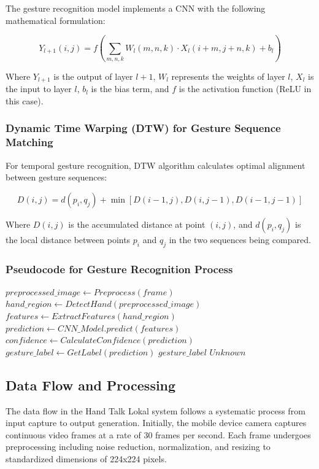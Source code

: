 \documentclass[12pt]{article}
\begin{document}
The gesture recognition model implements a CNN with the following mathematical formulation:

\[
Y_{l+1}(i,j) = f\left(\sum_{m,n,k} W_l(m,n,k) \cdot X_l(i+m, j+n, k) + b_l\right)
\]

Where $Y_{l+1}$ is the output of layer $l+1$, $W_l$ represents the weights of layer $l$, $X_l$ is the input to layer $l$, $b_l$ is the bias term, and $f$ is the activation function (ReLU in this case).

\subsubsection{Dynamic Time Warping (DTW) for Gesture Sequence Matching}

For temporal gesture recognition, DTW algorithm calculates optimal alignment between gesture sequences:

\[
D(i,j) = d(p_i, q_j) + \min\left[D(i-1,j), D(i,j-1), D(i-1,j-1)\right]
\]

Where $D(i,j)$ is the accumulated distance at point $(i,j)$, and $d(p_i, q_j)$ is the local distance between points $p_i$ and $q_j$ in the two sequences being compared.

\subsubsection{Pseudocode for Gesture Recognition Process}

\begin{algorithmic}[1]
    \State $preprocessed\_image \gets Preprocess(frame)$
    \State $hand\_region \gets DetectHand(preprocessed\_image)$
    \State $features \gets ExtractFeatures(hand\_region)$
    \State $prediction \gets CNN\_Model.predict(features)$
    \State $confidence \gets CalculateConfidence(prediction)$
        \State $gesture\_label \gets GetLabel(prediction)$
        \State \Return $gesture\_label$
    \Else
        \State \Return $Unknown$
    \EndIf
\EndProcedure
\end{algorithmic}

\subsection{Data Flow and Processing}

The data flow in the Hand Talk Lokal system follows a systematic process from input capture to output generation. Initially, the mobile device camera captures continuous video frames at a rate of 30 frames per second. Each frame undergoes preprocessing including noise reduction, normalization, and resizing to standardized dimensions of 224x224 pixels.
\end{document}
